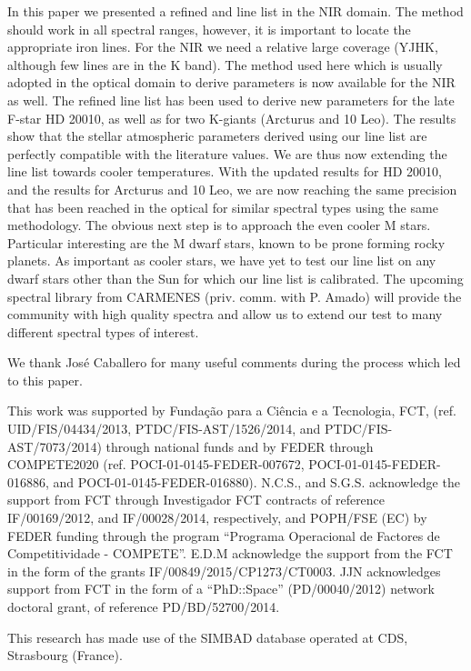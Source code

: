 \documentclass{aa}
\begin{document}
In this paper we presented a refined  and  line list in
the NIR domain. The method should work in all spectral ranges, however, it is
important to locate the appropriate iron lines. For the NIR we need a relative
large coverage (YJHK, although few lines are in the K band). The method used
here which is usually adopted in the optical domain to derive parameters is now
available for the NIR as well. The refined line list has been used to derive new
parameters for the late F-star HD 20010, as well as for two K-giants (Arcturus
and 10 Leo). The results show that the stellar atmospheric parameters derived
using our line list are perfectly compatible with the literature values. We are
thus now extending the line list towards cooler temperatures. With the updated
results for HD 20010, and the results for Arcturus and 10 Leo, we are now
reaching the same precision that has been reached in the optical for similar
spectral types using the same methodology. The obvious next step is to approach
the even cooler M stars. Particular interesting are the M dwarf stars, known to
be prone forming rocky planets. As important as cooler stars, we have yet to
test our line list on any dwarf stars other than the Sun for which our line list
is calibrated. The upcoming spectral library from CARMENES (priv. comm. with P.
Amado) will provide the community with high quality spectra and allow us to
extend our test to many different spectral types of interest.



\begin{acknowledgements}

We thank Jos\'e Caballero for many useful comments during the process which
led to this paper.

This work was supported by Funda\c{c}\~ao para a Ci\^encia e a Tecnologia, FCT,
(ref. UID/FIS/04434/2013, PTDC/FIS-AST/1526/2014, and PTDC/FIS-AST/7073/2014)
through national funds and by FEDER through COMPETE2020 (ref.
POCI-01-0145-FEDER-007672, POCI-01-0145-FEDER-016886, and
POCI-01-0145-FEDER-016880). N.C.S., and S.G.S. acknowledge the support from FCT
through Investigador FCT contracts of reference IF/00169/2012, and
IF/00028/2014, respectively, and POPH/FSE (EC) by FEDER funding through the
program “Programa Operacional de Factores de Competitividade - COMPETE”. E.D.M
acknowledge the support from the FCT in the form of the grants
IF/00849/2015/CP1273/CT0003. JJN acknowledges support from FCT in the form of a
“PhD::Space” (PD/00040/2012) network doctoral grant, of reference
PD/BD/52700/2014.

This research has made use of the SIMBAD database operated at CDS, Strasbourg
(France).

\end{acknowledgements}
\end{document}
